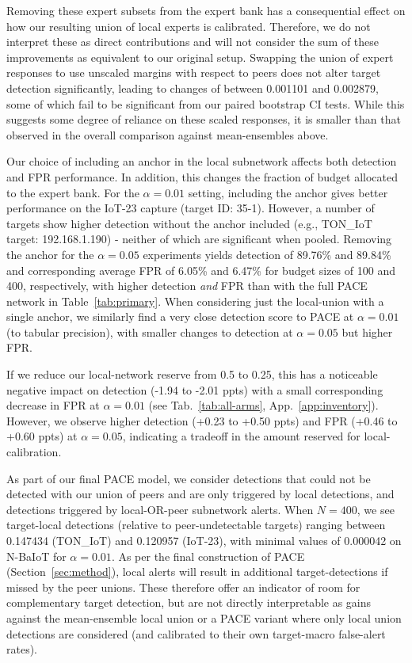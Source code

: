 Removing these expert subsets from the expert bank has a consequential effect on how our resulting union of local experts is calibrated. Therefore, we do not interpret these as direct contributions and will not consider the sum of these improvements as equivalent to our original setup. Swapping the union of expert responses to use unscaled margins with respect to peers does not alter target detection significantly, leading to changes of between 0.001101 and 0.002879, some of which fail to be significant from our paired bootstrap CI tests. While this suggests some degree of reliance on these scaled responses, it is smaller than that observed in the overall comparison against mean-ensembles above.

Our choice of including an anchor in the local subnetwork affects both detection and FPR performance. In addition, this changes the fraction of budget allocated to the expert bank. For the $\alpha = 0.01$ setting, including the anchor gives better performance on the IoT-23 capture (target ID: 35-1). However, a number of targets show higher detection without the anchor included (e.g., TON\_IoT target: 192.168.1.190) - neither of which are significant when pooled. Removing the anchor for the $\alpha = 0.05$ experiments yields detection of 89.76\% and 89.84\% and corresponding average FPR of 6.05\% and 6.47\% for budget sizes of 100 and 400, respectively, with higher detection \emph{and} FPR than with the full PACE network in Table~\ref{tab:primary}. When considering just the local-union with a single anchor, we similarly find a very close detection score to PACE at $\alpha=0.01$ (to tabular precision), with smaller changes to detection at $\alpha = 0.05$ but higher FPR.

If we reduce our local-network reserve from 0.5 to 0.25, this has a noticeable negative impact on detection (-1.94 to -2.01 ppts) with a small corresponding decrease in FPR at $\alpha = 0.01$ (see Tab.~\ref{tab:all-arms}, App.~\ref{app:inventory}). However, we observe higher detection (+0.23 to +0.50 ppts) and FPR (+0.46 to +0.60 ppts) at $\alpha = 0.05$, indicating a tradeoff in the amount reserved for local-calibration.

As part of our final PACE model, we consider detections that could not be detected with our union of peers and are only triggered by local detections, and detections triggered by local-OR-peer subnetwork alerts. When $N = 400$, we see target-local detections (relative to peer-undetectable targets) ranging between 0.147434 (TON\_IoT) and 0.120957 (IoT-23), with minimal values of 0.000042 on N-BaIoT for $\alpha = 0.01$. As per the final construction of PACE (Section~\ref{sec:method}), local alerts will result in additional target-detections if missed by the peer unions. These therefore offer an indicator of room for complementary target detection, but are not directly interpretable as gains against the mean-ensemble local union or a PACE variant where only local union detections are considered (and calibrated to their own target-macro false-alert rates).

